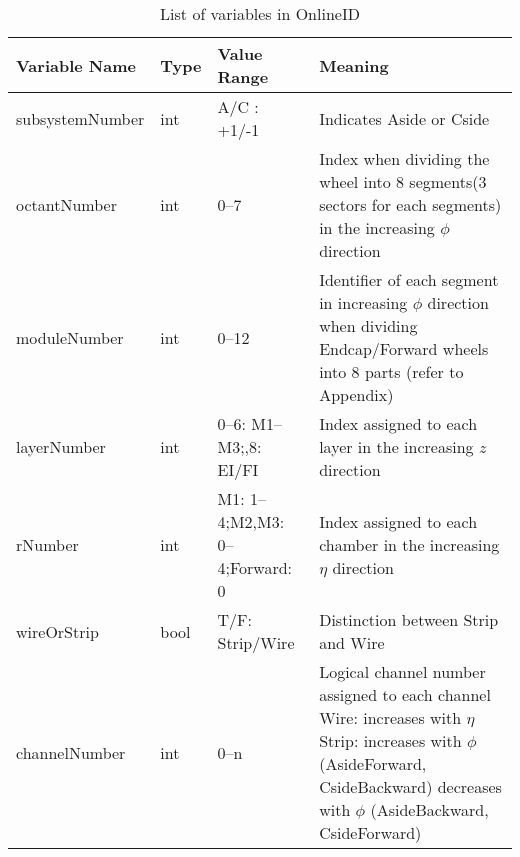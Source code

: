 \begin{table}[htbp]
  \centering
  \caption{List of variables in OnlineID}
  \label{tab:OnlineID}
  \begin{tabular}{|l|l|p{3cm}|p{6cm}|}
    \hline
    \textbf{Variable Name} & \textbf{Type} & \textbf{Value Range} & \textbf{Meaning} \\
    \hline
    subsystemNumber & int & A/C : +1/-1 & Indicates Aside or Cside \\
    \hline
    octantNumber & int & 0--7 & Index when dividing the wheel into 8 segments(3 sectors for each segments) in the increasing $\phi$ direction\\
    \hline
    moduleNumber & int & 0--12 & Identifier of each segment in increasing $\phi$ direction when dividing Endcap/Forward wheels into 8 parts (refer to Appendix)\\
    \hline
    layerNumber & int & 0--6: M1--M3;\newline 7,8: EI/FI & Index assigned to each layer in the increasing $z$ direction \\
    \hline
    rNumber & int & M1: 1--4;\newline M2,M3: 0--4;\newline Forward: 0 & Index assigned to each chamber in the increasing $\eta$ direction \\
    \hline
    wireOrStrip & bool & T/F: Strip/Wire & Distinction between Strip and Wire \\
    \hline
    channelNumber & int & 0--n & Logical channel number assigned to each channel \newline Wire: increases with $\eta$ \newline Strip: increases with $\phi$ \newline (AsideForward, CsideBackward) \newline decreases with $\phi$ \newline (AsideBackward, CsideForward) \\
    \hline
  \end{tabular}
\end{table}